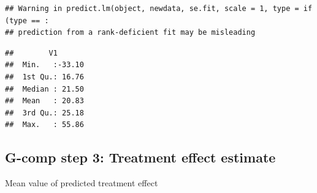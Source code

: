 \documentclass[
]{book}
\newenvironment{Shaded}{\begin{snugshade}}{\end{snugshade}}
\newcommand{\AttributeTok}[1]{\textcolor[rgb]{0.77,0.63,0.00}{#1}}
\newcommand{\DecValTok}[1]{\textcolor[rgb]{0.00,0.00,0.81}{#1}}
\newcommand{\FunctionTok}[1]{\textcolor[rgb]{0.00,0.00,0.00}{#1}}
\newcommand{\NormalTok}[1]{#1}
\newcommand{\OtherTok}[1]{\textcolor[rgb]{0.56,0.35,0.01}{#1}}
\newcommand{\SpecialCharTok}[1]{\textcolor[rgb]{0.00,0.00,0.00}{#1}}
\newcommand{\StringTok}[1]{\textcolor[rgb]{0.31,0.60,0.02}{#1}}
\begin{document}
\begin{Shaded}
\end{Shaded}

\begin{verbatim}
## Warning in predict.lm(object, newdata, se.fit, scale = 1, type = if (type == :
## prediction from a rank-deficient fit may be misleading
\end{verbatim}

\begin{Shaded}
\end{Shaded}

\begin{verbatim}
##        V1        
##  Min.   :-33.10  
##  1st Qu.: 16.76  
##  Median : 21.50  
##  Mean   : 20.83  
##  3rd Qu.: 25.18  
##  Max.   : 55.86
\end{verbatim}

\hypertarget{g-comp-step-3-treatment-effect-estimate-1}{%
\subsection{G-comp step 3: Treatment effect estimate}\label{g-comp-step-3-treatment-effect-estimate-1}}

\begin{Shaded}
\end{Shaded}

Mean value of predicted treatment effect

\begin{Shaded}
\end{Shaded}
\end{document}
